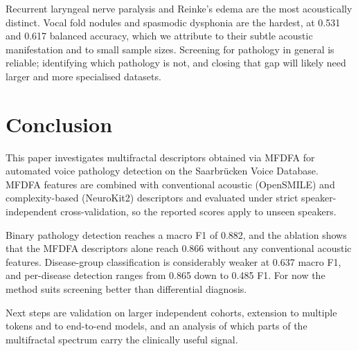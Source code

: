 \documentclass[runningheads]{llncs}
\begin{document}
  Recurrent laryngeal nerve paralysis and Reinke's edema are the most acoustically distinct. Vocal fold nodules and spasmodic dysphonia are the hardest, at 0.531 and 0.617 balanced accuracy, which we attribute to their subtle acoustic manifestation and to small sample sizes. Screening for pathology in general is reliable; identifying which pathology is not, and closing that gap will likely need larger and more specialised datasets.


  \section{Conclusion}
  \label{sec:conclusion}

  This paper investigates multifractal descriptors obtained via MFDFA for automated voice pathology detection on the Saarbrücken Voice Database. MFDFA features are combined with conventional acoustic (OpenSMILE) and complexity-based (NeuroKit2) descriptors and evaluated under strict speaker-independent cross-validation, so the reported scores apply to unseen speakers.

  Binary pathology detection reaches a macro F1 of 0.882, and the ablation shows that the MFDFA descriptors alone reach 0.866 without any conventional acoustic features. Disease-group classification is considerably weaker at 0.637 macro F1, and per-disease detection ranges from 0.865 down to 0.485 F1. For now the method suits screening better than differential diagnosis.

  Next steps are validation on larger independent cohorts, extension to multiple tokens and to end-to-end models, and an analysis of which parts of the multifractal spectrum carry the clinically useful signal.



\end{document}
